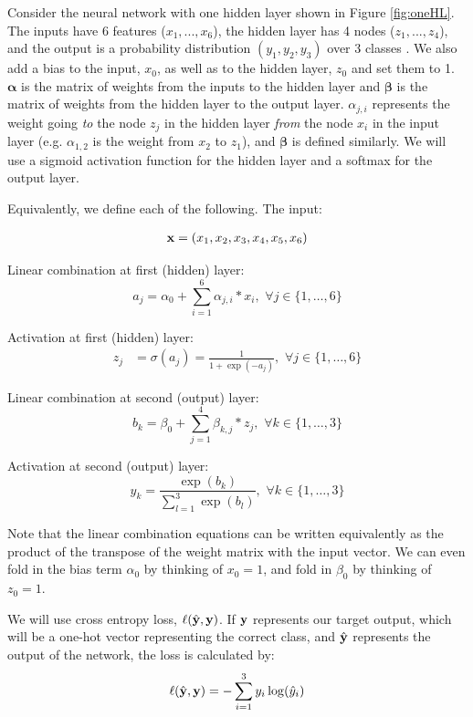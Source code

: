 Consider the neural network with one hidden layer shown in Figure \ref{fig:oneHL}. The inputs have 6 features ($x_1,...,x_6$), the hidden layer has 4  nodes ($z_1,...,z_4$), and the output is a probability distribution $(y_1, y_2, y_3)$ over 3 classes . We also add a bias to the input, $x_0$, as well as to the hidden layer, $z_0$ and set them to 1.
$\boldsymbol{\alpha}$ is the matrix of weights from the inputs to the hidden layer and $\boldsymbol{\beta}$ is the matrix of weights from the hidden layer to the output layer. 
$\alpha_{j,i}$ represents the weight going \textit{to} the node $z_j$ in the hidden layer \textit{from} the node $x_i$ in the input layer (e.g. $\alpha_{1,2}$ is the weight from $x_2$ to $z_1$), and $\boldsymbol{\beta}$ is defined similarly. We will use a sigmoid activation function for the hidden layer and a softmax for the output layer.

Equivalently, we define each of the following. The input:

\begin{align}
\bold{x}=(x_1,x_2,x_3,x_4,x_5,x_6)
\end{align}

Linear combination at first (hidden) layer:
\begin{equation}
a_j= \alpha_0 + \sum_{i=1}^6 \alpha_{j,i}*x_i,\,\, \forall j \in \{1,\ldots,6\}
\end{equation}

Activation at first (hidden) layer:
\begin{align}
z_j &= \sigma(a_j) = \frac{1}{1+\exp(-a_j)},\,\, \forall j \in \{1,\ldots,6\}
\end{align}

Linear combination at second (output) layer:
\begin{equation}
b_k = \beta_0 + \sum_{j=1}^4 \beta_{k,j}*z_j,\,\, \forall k \in \{1,\ldots,3\}
\end{equation}

Activation at second (output) layer:
\begin{equation}
y_k = \frac{\exp(b_k)}{\sum\limits_{l=1}^3 \exp(b_l)},\,\, \forall k \in \{1,\ldots,3\}
\end{equation}

Note that the linear combination equations can be written equivalently as the product of the transpose of the weight matrix with the input vector. We can even fold in the bias term $\alpha_0$ by thinking of $x_0 = 1$, and fold in $\beta_0$ by thinking of $z_0 = 1$.

We will use cross entropy loss, $\ell(\hat{\mathbf{y}},\mathbf{y})$. If $\mathbf{y}$ represents our target output, which will be a one-hot vector representing the correct class, and $\hat{\mathbf{y}}$ represents the output of the network, the loss is calculated by:
\begin{equation}
   \ell(\hat{\mathbf{y}},\mathbf{y}) = - \sum_{i=1}^3 y_i \log(\hat{y}_i)
\end{equation}

